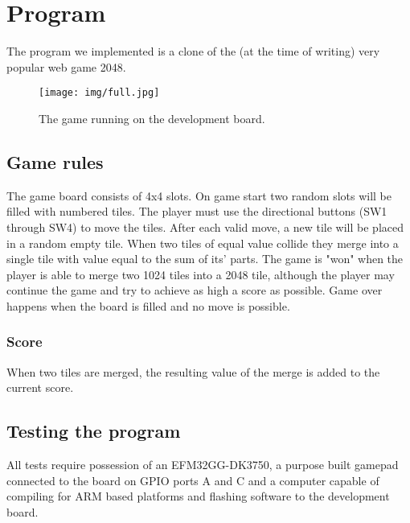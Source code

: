 \section{Program}
The program we implemented is a clone of the (at the time of writing) very popular web game 2048\cite{2048}. 

\begin{figure}[h!]
    \centering
    \texttt{[image: img/full.jpg]}
    \caption{The game running on the development board.}
\end{figure}

\subsection{Game rules\label{game_rules}}
The game board consists of 4x4 slots.
On game start two random slots will be filled with numbered tiles.
The player must use the directional buttons (SW1 through SW4) to move the tiles.
After each valid move, a new tile will be placed in a random empty tile.
When two tiles of equal value collide they merge into a single tile with value equal to the sum of its' parts.
The game is "won" when the player is able to merge two 1024 tiles into a 2048 tile, although the player may continue the game and try to achieve as high a score as possible.
Game over happens when the board is filled and no move is possible.

\subsubsection{Score}
When two tiles are merged, the resulting value of the merge is added to the current score.

\subsection{Testing the program}
All tests require possession of an EFM32GG-DK3750, a purpose built gamepad connected to the board on GPIO ports A and C and a computer capable of compiling for ARM based platforms and flashing software to the development board.

